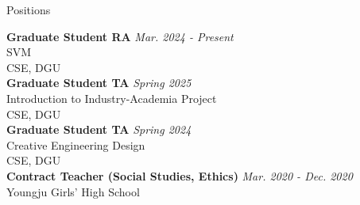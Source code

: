 \begin{rSection}{Positions}

{\bf Graduate Student \acf{RA}} \hfill {\em Mar. 2024 - Present} \\
\acf{SVM}\\
\acf{CSE}, \acf{DGU}\\

{\bf Graduate Student \acf{TA}} \hfill {\em Spring 2025} \\
Introduction to Industry-Academia Project\\
\acf{CSE}, \acf{DGU}\\


{\bf Graduate Student \acf{TA}} \hfill {\em Spring 2024} \\
Creative Engineering Design\\
\acf{CSE}, \acf{DGU}\\

{\bf Contract Teacher (Social Studies, Ethics)} \hfill {\em Mar. 2020 - Dec. 2020} \\
Youngju Girls' High School \\

\end{rSection}
        